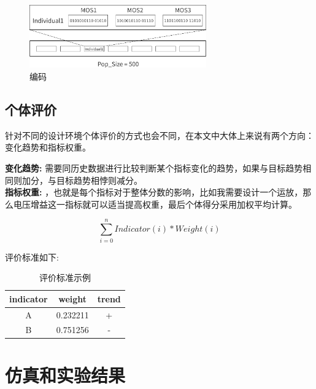 \documentclass[14pt, a4paper]{article}
\begin{document}
        \begin{figure}[htbp]
            \centering
            \includegraphics[width= 3in]{fig/encoding_black.png}
            \caption{编码}
            \label{fig3}
        \end{figure}
    \subsection{个体评价}
        针对不同的设计环境个体评价的方式也会不同，在本文中大体上来说有两个方向：变化趋势和指标权重。
        
        \textbf{变化趋势: }需要同历史数据进行比较判断某个指标变化的趋势，如果与目标趋势相同则加分，与目标趋势相悖则减分。 \\
        
        \textbf{指标权重: }，也就是每个指标对于整体分数的影响，比如我需要设计一个运放，那么电压增益这一指标就可以适当提高权重，最后个体得分采用加权平均计算。
        
        $$\sum_{i=0}^{n} Indicator(i) * Weight(i)$$
        
        评价标准如下:
        \begin{table}[htbp]
            \centering
            \begin{tabular}{ccc}
                \toprule
                indicator & weight & trend \\
                \midrule
                A & 0.232211 & + \\
                B & 0.751256 & - \\
                \bottomrule
            \end{tabular}
            \caption{评价标准示例}
        \end{table}
\section{仿真和实验结果}
\end{document}
